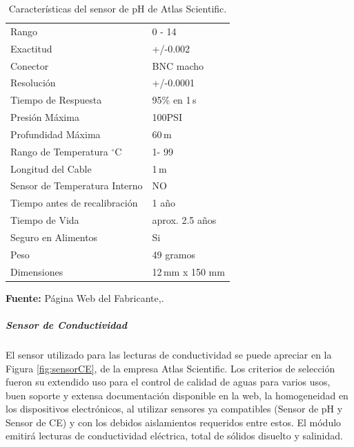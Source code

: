 \begin{table}[H]
\protect\caption[Características del sensor de pH de Atlas Scientific]{Características del sensor de pH de Atlas Scientific.}
\label{tab: caract_sondaph}
\begin{center}
\begin{tabular}{l l}
\hline
Rango    &  0 - 14\\
Exactitud      &  +/-0.002\\
Conector &  BNC macho\\
Resolución   &  +/-0.0001\\
Tiempo de Respuesta   &  95\% en 1 s\\
Presión Máxima    &  100PSI\\
Profundidad Máxima	& 60 m\\
Rango de Temperatura $^{\circ}$C	& 1- 99\\
Longitud del Cable	& 1 m\\
Sensor de Temperatura Interno	& NO\\
Tiempo antes de recalibraci\'on	& 1 año\\
Tiempo de Vida	& aprox. 2.5 años\\
Seguro en Alimentos & Si\\
Peso & 49 gramos\\
Dimensiones & 12 mm x 150 mm\\
\hline
\end{tabular}
\vspace{5mm}
\newline
\hfill
\textbf{Fuente: }P\'agina Web del Fabricante,\cite{atlasph}. 
\end{center}
\end{table} 

\subparagraph{Sensor de Conductividad}
El sensor utilizado para las lecturas de conductividad se puede apreciar en la Figura \ref{fig:sensorCE}, de la empresa Atlas Scientific. Los criterios de selecci\'on fueron su extendido uso para el control de calidad de aguas para varios usos, buen soporte y extensa documentaci\'on disponible en la web, la homogeneidad en los dispositivos electr\'onicos, al utilizar sensores ya compatibles (Sensor de pH y Sensor de CE) y con los debidos aislamientos requeridos entre estos. El m\'odulo emitir\'a lecturas de conductividad el\'ectrica, total de s\'olidos disuelto y salinidad.

